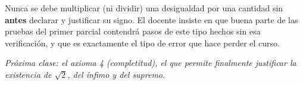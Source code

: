 \documentclass[12pt,a4paper]{article}
\begin{document}
\begin{warnbox}
Nunca se debe multiplicar (ni dividir) una desigualdad por una cantidad sin
\textbf{antes} declarar y justificar su signo. El docente insiste en que
buena parte de las pruebas del primer parcial contendrá pasos de este tipo
hechos sin esa verificación, y que es exactamente el tipo de error que hace
perder el curso.
\end{warnbox}

\emph{Próxima clase: el axioma 4 (completitud), el que permite finalmente
justificar la existencia de $\sqrt{2}$, del ínfimo y del supremo.}
\end{document}

